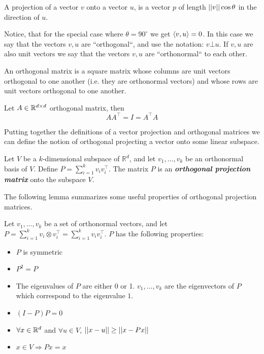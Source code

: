 \begin{definition}
A projection of a vector $v$ onto a vector $u$, is a vector $p$ of length $\left|\left| v\right|\right| \cos \theta$ in the direction of $u$.
\end{definition}


Notice, that for the special case where $\theta=90^{\circ}$ we get $\left\langle v,u\right\rangle=0$. In this case we say that the vectors $v,u$ are ``orthogonal``, and use the notation: $v\bot u$. If $v,u$ are also unit vectors we say that the vectors $v,u$ are ``orthonormal`` to each other.



\begin{definition}
An orthogonal matrix is a square matrix whose columns are unit vectors orthogonal to one another (i.e. they are orthonormal vectors) and whose rows are unit vectors orthogonal to one another.
\end{definition}

\begin{lemma}
Let $A\in \mathbb{R}^{d\times d}$ orthogonal matrix, then $$AA^\top=I=A^\top A$$
\end{lemma}

Putting together the definitions of a vector projection and orthogonal matrices we can define the notion of orthogonal projecting a vector onto some linear subspace.

\begin{definition}

Let $V$ be a $k$-dimensional subspace of $\mathbb{R}^{d}$, and let $v_{1},\ldots,v_{k}$ be an orthonormal basis of $V$. Define $P=\sum_{i=1}^{k}v_{i}v_{i}^{\top}$. The matrix $P$ is an \textbf{\emph{orthogonal projection matrix}}
onto the subspace $V$.
\end{definition}

The following lemma summarizes some useful properties of orthogonal projection matrices.
\begin{lemma}
Let $v_1,\ldots,v_k$ be a set of orthonormal vectors, and let $P=\sum_{i=1}^{k}v_i \otimes  v_i^\top=\sum_{i=1}^{k}v_{i}v_{i}^{\top}$. $P$ has the following properties:
	
\begin{itemize}
	\item $P$ is symmetric
	\item $P^{2}=P$
	\item The eigenvalues of $P$ are either 0 or 1. $v_1,\ldots,v_k$
	are the eigenvectors of $P$ which correspond to the eigenvalue $1$.
	\item $(I-P)P=0$
	\item $\forall x\in\mathbb{R}^d$ and $\forall u\in V$, $\left|\left| x-u\right|\right| \geq \left|\left| x-Px\right|\right|$
	\item $x\in V\Rightarrow Px=x$
\end{itemize}
\end{lemma}

